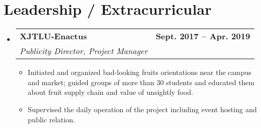 \documentclass[letterpaper,11pt]{article}
\makeatletter
\newcommand{\resumeItem}[1]{
  \item\small{
    {#1 \vspace{-2pt}}
  }
}
\newcommand{\resumeSubheading}[4]{
  \vspace{-2pt}\item
    \begin{tabular*}{1.0\textwidth}[t]{l@{\extracolsep{\fill}}r}
      \textbf{#1} & \textbf{\small #2} \\
      \textit{\small#3} & \textit{\small #4} \\
    \end{tabular*}\vspace{-7pt}
}
\newcommand{\resumeSubHeadingListStart}{\begin{itemize}[leftmargin=0.0in, label={}]}
\newcommand{\resumeSubHeadingListEnd}{\end{itemize}}
\newcommand{\resumeItemListStart}{\begin{itemize}}
\newcommand{\resumeItemListEnd}{\end{itemize}\vspace{-5pt}}
\makeatother
\begin{document}
\section{Leadership / Extracurricular}
    \resumeSubHeadingListStart
        \resumeSubheading{XJTLU-Enactus}{Sept. 2017 -- Apr. 2019}{Publicity Director, Project Manager}{}
            \resumeItemListStart
                \resumeItem{Initiated and organized bad-looking fruits orientations near the campus and market; guided groups of more than 30 students and educated them about fruit supply chain and value of unsightly food.}
                \resumeItem{Supervised the daily operation of the project including event hosting and public relation.}
            \resumeItemListEnd
        
    \resumeSubHeadingListEnd
\end{document}
